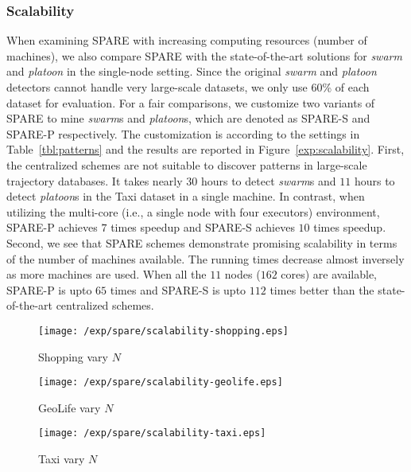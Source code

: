 \subsubsection{Scalability}
When examining SPARE with increasing computing resources (number of machines), we also compare SPARE with the state-of-the-art solutions for \emph{swarm} and \emph{platoon} in the single-node setting. Since the original \emph{swarm} and \emph{platoon} detectors cannot handle very large-scale datasets, we only use 60\% of each dataset for evaluation. For a fair comparisons, we customize two variants of SPARE to mine \emph{swarm}s and \emph{platoon}s, which are denoted as SPARE-S and SPARE-P respectively. The customization is according to the settings in Table~\ref{tbl:patterns} and the results are reported in Figure~\ref{exp:scalability}. 
First, the centralized schemes are not suitable to discover patterns in 
large-scale trajectory databases. It takes nearly $30$ hours to 
detect \emph{swarm}s and $11$ hours to detect \emph{platoon}s in the Taxi dataset in a single machine. 
In contrast, when utilizing the multi-core (i.e., a single node with four executors) environment, 
SPARE-P achieves $7$ times speedup and SPARE-S achieves $10$ times speedup. 
Second, we see that SPARE schemes demonstrate promising scalability in terms of the number of machines available. The running times decrease almost inversely as more machines are used. 
When all the $11$ nodes ($162$ cores) are available, 
SPARE-P is upto $65$ times and SPARE-S is upto $112$ times better than the state-of-the-art centralized schemes.
%
\begin{figure*}[t]
\centering
\begin{subfigure}[b]{0.3\textwidth}
    \texttt{[image: /exp/spare/scalability-shopping.eps]}
        \caption{Shopping vary $N$}
    \end{subfigure}
 	 \begin{subfigure}[b]{0.3\textwidth}
        \texttt{[image: /exp/spare/scalability-geolife.eps]}
        \caption{GeoLife vary $N$}
    \end{subfigure}
    	 \begin{subfigure}[b]{0.3\textwidth}
        \texttt{[image: /exp/spare/scalability-taxi.eps]}
        \caption{Taxi vary $N$}
    \end{subfigure}
 \caption{Comparisons among TRMP, SPARE, PLATOON and SWARM.}
 \label{exp:scalability}
\end{figure*}
